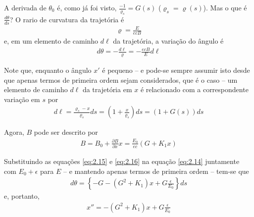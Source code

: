 A derivada de $\theta_0$ é, como já foi visto, $\frac{-1}{\varrho_s} = G(s)$ ($\varrho_s = \varrho(s)$). Mas o que é $\frac{d\theta}{ds}$? O rario de curvatura da trajetória é
\begin{align}
	\varrho = \frac{E}{ecB}
\end{align}
e, em um elemento de caminho $d\ell$ da trajetória, a variação do ângulo é
\begin{align}
	d\theta = -\frac{d\ell}{\varrho} = -\frac{ecB}{E}d\ell\label{eq:2.14}
\end{align}

Note que, enquanto o ângulo $x'$ é pequeno -- e pode-se sempre assumir isto desde que apenas termos de primeira ordem sejam considerados, que é o caso -- um elemento de caminho $d\ell$ da trajetória em $x$ é relacionado com a correspondente variação em $s$ por
\begin{align}
	d\ell = \frac{\varrho_s - x}{\varrho_s} ds = \left(1+\frac{x}{\varrho_s}\right)ds = (1+G(s))ds\label{eq:2.15}
\end{align}

Agora, $B$ pode ser descrito por
\begin{align}
	B = B_0 + \frac{\partial B}{\partial x}x = \frac{E_0}{ec}(G+K_1x)\label{eq:2.16}
\end{align}

Substituindo as equações \eqref{eq:2.15} e \eqref{eq:2.16} na equação \eqref{eq:2.14} juntamente com $E_0+\epsilon$ para $E$ -- e mantendo apenas termos de primeira ordem -- tem-se que
\begin{align}
	d\theta = \left\{-G-(G^2+K_1)x + G\frac{\epsilon}{E_0}\right\}ds
\end{align}
e, portanto, 
\begin{align}
	x'' = -(G^ 2+K_1)x + G\frac{\epsilon}{E_0}
\end{align}

